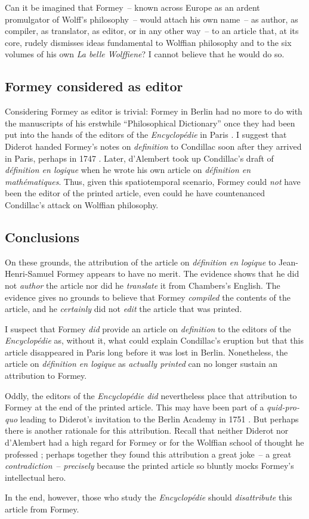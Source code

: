 \documentclass[output=paper]{langscibook}
\begin{document}
Can it be imagined that Formey~-- known across Europe as an ardent promulgator of Wolff’s philosophy~-- would attach his own name~-- as author, as compiler, as translator, as editor, or in any other way~-- to an article that, at its core, rudely dismisses ideas fundamental to Wolffian philosophy and to the six volumes of his own \emph{La belle Wolffiene}? I cannot believe that he would do so. 

\subsection{Formey considered as editor}

Considering Formey as editor is trivial: Formey in Berlin had no more to do with the manuscripts of his erstwhile “Philosophical Dictionary” once they had been put into the hands of the editors of the \emph{Encyclopédie} in Paris \citep[145]{Moureau1987}. I suggest that Diderot handed Formey’s notes on \emph{definition} to Condillac soon after they arrived in Paris, perhaps in 1747 \citep[128-9]{Moureau1987}. Later, d’Alembert took up Condillac’s draft of \emph{définition en logique} when he wrote his own article on \emph{définition en mathématiques}. Thus, given this spatiotemporal scenario, Formey could \emph{not} have been the editor of the printed article, even could he have countenanced Condillac’s attack on Wolffian philosophy.

\subsection{Conclusions}

On these grounds, the attribution of the article on \emph{définition en logique} to Jean-Henri-Samuel Formey appears to have no merit. The evidence shows that he did not \emph{author} the article nor did he \emph{translate} it from Chambers’s English. The evidence gives no grounds to believe that Formey \emph{compiled} the contents of the article, and he \emph{certainly} did not \emph{edit} the article that was printed. 

I suspect that Formey \emph{did} provide an article on \emph{definition} to the editors of the \emph{Encyclopédie } as, without it, what could explain Condillac’s eruption but that this article disappeared in Paris long before it was lost in Berlin. Nonetheless, the article on \emph{définition en logique} as \emph{actually printed} can no longer sustain an attribution to Formey. 

Oddly, the editors of the \emph{Encyclopédie did} nevertheless place that attribution to Formey at the end of the printed article. This may have been part of a \emph{quid-pro-quo} leading to Diderot’s invitation to the Berlin Academy in 1751 \citep[136]{Moureau1987}. But perhaps there is another rationale for this attribution. Recall that neither Diderot nor d’Alembert had a high regard for Formey or for the Wolffian school of thought he professed \citep[141]{Kafker1989}; perhaps together they found this attribution a great joke~-- a great \emph{contradiction}~-- \emph{precisely} because the printed article so bluntly mocks Formey’s intellectual hero.

In the end, however, those who study the \emph{Encyclopédie} should \emph{disattribute} this article from Formey.

{\sloppy\printbibliography[heading=subbibliography,notkeyword=this]}
\end{document}

